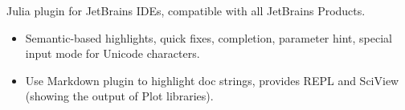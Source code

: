\documentclass{resume}
\begin{document}
Julia plugin for JetBrains IDEs, compatible with all JetBrains Products.
\begin{itemize}
  \item Semantic-based highlights, quick fixes, completion, parameter hint, special input mode for Unicode characters.
  \item Use Markdown plugin to highlight doc strings, provides REPL and SciView (showing the output of Plot libraries).
\end{itemize}


\end{document}
